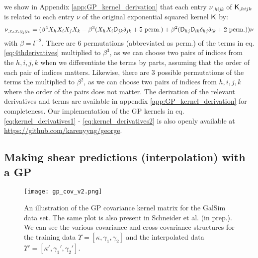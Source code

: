 we show in Appendix \ref{app:GP_kernel_derivation} 
that each entry $\nu_{,hijk}$ of $\mathsf{K}_{,hijk}$ is
related to each entry $\nu$ of the original exponential squared kernel
$\mathsf{K}$ by:
\begin{equation}
\nu_{,x_h x_i y_j y_k} = (\beta^4 X_h X_i X_j X_k -
\beta^3 (X_h X_i \mathsf{D}_{jk} \delta_{jk} + 5~{\rm perm.}) + \beta^2
(\mathsf{D}_{hj} \mathsf{D}_{ik}\delta_{hj}\delta_{ik} + 2~{\rm perm.})) \nu
\label{eq:4thderivatives}
\end{equation}
with $\beta = l^{-2}$. There are 6 permutations (abbreviated as perm.) of the terms in
eq. \ref{eq:4thderivatives}
multiplied to $\beta^3$, as we can choose two pairs of indices from the $h,i,j,k$ 
when we differentiate the terms by parts, assuming that the order of each
pair of indices matters. 
Likewise, there are 3 possible permutations of
the terms the multiplied to $\beta^2$, as we can choose two pairs of indices from
$h, i, j, k$ where the order of the pairs does not matter.
The derivation of the relevant derivatives and terms are available 
in appendix \ref{app:GP_kernel_derivation} for completeness. 
Our implementation of the GP kernels in eq. \ref{eq:kernel_derivatives1} - 
\ref{eq:kernel_derivatives2} is also openly available at
\href{https://github.com/karenyyng/george}{https://github.com/karenyyng/george}.


\subsection{Making shear predictions (interpolation) with a GP}


\begin{figure}
	\centering
	\texttt{[image: gp\_cov\_v2.png]}
	\caption{An illustration of the GP covariance kernel matrix for the {\sc GalSim} data set.
		The same plot is also present in Schneider et al. (in prep.). We can see the various covariance
		and cross-covariance
		structures for the training data $\Upsilon = [\kappa, \gamma_1, \gamma_2]$
		and the interpolated data $\Upsilon' = [\kappa', \gamma_1', \gamma_2']$.
		\label{fig:GP_kernel_vis}}
\end{figure}

